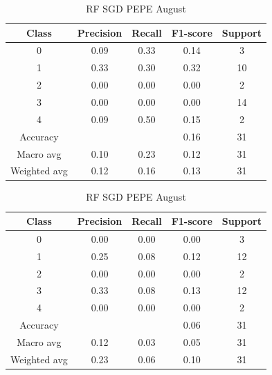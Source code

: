 \begin{enumerate}
\begin{enumerate}
                \begin{table}[H]
                \centering
                \scriptsize
                \begin{minipage}{0.48\textwidth}
                \centering
                \begin{tabular}{c|cccc}
                \hline
                Class & Precision & Recall & F1-score & Support \\
                \hline
                0 & 0.09 & 0.33 & 0.14 & 3 \\
                1 & 0.33 & 0.30 & 0.32 & 10 \\
                2 & 0.00 & 0.00 & 0.00 & 2 \\
                3 & 0.00 & 0.00 & 0.00 & 14 \\
                4 & 0.09 & 0.50 & 0.15 & 2 \\
                \hline
                Accuracy &       &      & 0.16 & 31 \\
                Macro avg & 0.10 & 0.23 & 0.12 & 31 \\
                Weighted avg & 0.12 & 0.16 & 0.13 & 31 \\
                \hline
                \end{tabular}
                \caption{RF SGD DOGE August}
                \label{tab:classifier_2_report_rf_sgd_doge_filtered_aug}
                \end{minipage}%
                \hfill
                \begin{minipage}{0.48\textwidth}
                \centering
                \begin{tabular}{c|cccc}
                \hline
                Class & Precision & Recall & F1-score & Support \\
                \hline
                0 & 0.00 & 0.00 & 0.00 & 3 \\
                1 & 0.25 & 0.08 & 0.12 & 12 \\
                2 & 0.00 & 0.00 & 0.00 & 2 \\
                3 & 0.33 & 0.08 & 0.13 & 12 \\
                4 & 0.00 & 0.00 & 0.00 & 2 \\
                \hline
                Accuracy &       &      & 0.06 & 31 \\
                Macro avg & 0.12 & 0.03 & 0.05 & 31 \\
                Weighted avg & 0.23 & 0.06 & 0.10 & 31 \\
                \hline
                \end{tabular}
                \caption{RF SGD PEPE August}
                \label{tab:classifier_2_report_rf_sgd_pepe_filtered_aug}
                \end{minipage}
                

\end{table}
\end{enumerate}
\end{enumerate}
